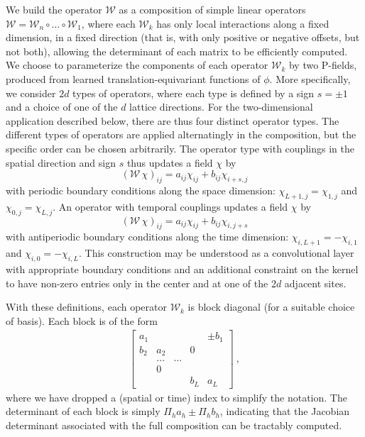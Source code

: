 \documentclass[aps,prd,twocolumn,nofootinbib,superscriptaddress,preprintnumbers]{revtex4-1}
\begin{document}
We build the operator $\mathcal{W}$ as a composition of simple linear operators $\mathcal{W}=\mathcal{W}_n\circ\ldots\circ \mathcal{W}_1$, where each $\mathcal{W}_k$ has only local interactions along a fixed dimension, in a fixed direction (that is, with only positive or negative offsets, but not both), allowing the determinant of each matrix to be efficiently computed. We choose to parameterize the components of each operator $\mathcal{W}_k$ by two P-fields, produced from learned translation-equivariant functions of $\phi$. More specifically, we consider $2d$ types of operators, where each type is defined by a sign $s=\pm 1$ and a choice of one of the $d$ lattice directions. For the two-dimensional application described below, there are thus four distinct operator types. The different types of operators are applied alternatingly in the composition, but the specific order can be chosen arbitrarily. The operator type with couplings in the spatial direction and sign $s$ thus updates a field $\chi$ by
%
\begin{equation}
    (\mathcal{W} \, \chi)_{ij} = a_{ij}\chi_{ij} + b_{ij}\chi_{i+s,j}
\end{equation}
%
with periodic boundary conditions along the space dimension: $\chi_{L+1,j}=\chi_{1, j}$ and $\chi_{0, j}=\chi_{L, j}$. An operator with temporal couplings updates a field $\chi$ by
%
\begin{equation}
    (\mathcal{W} \, \chi)_{ij} = a_{ij}\chi_{ij} + b_{ij}\chi_{i,j+s}
\end{equation}
%
with antiperiodic boundary conditions along the time dimension: $\chi_{i, L+1}=-\chi_{i, 1}$ and $\chi_{i, 0}=-\chi_{i, L}$. This construction may be understood as a convolutional layer with appropriate boundary conditions and an additional constraint on the kernel to have non-zero entries only in the center and at one of the $2d$ adjacent sites.

With these definitions, each operator $\mathcal{W}_k$ is block diagonal (for a suitable choice of basis). Each block is of the form
%
\begin{equation}
\begin{aligned}
    \begin{bmatrix}
    a_1 &  &  &  & \pm b_1\\ 
    b_2 &  a_2 &  & 0  & \\ 
     & \ldots & \ldots &  & \\ 
     & 0 &  &  & \\ 
     &  &  & b_L & a_L
    \end{bmatrix}\ ,
\end{aligned}
\end{equation}
%
where we have dropped a (spatial or time) index to simplify the notation. The determinant of each block is simply $\Pi_h a_h \pm \Pi_h b_h$, indicating that the Jacobian determinant associated with the full composition can be tractably computed.
\end{document}
